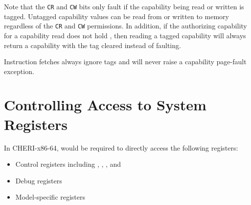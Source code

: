 Note that the \texttt{CR} and \texttt{CW} bits only fault if the
capability being read or written is tagged.  Untagged capability
values can be read from or written to memory regardless of the
\texttt{CR} and \texttt{CW} permissions.  In addition, if the
authorizing capability for a capability read does not hold \cappermLC,
then reading a tagged capability will always return a capability with
the tag cleared instead of faulting.

Instruction fetches always ignore tags and will never raise a
capability page-fault exception.

\section{Controlling Access to System Registers}

In CHERI-x86-64, \cappermASR{} would be required to directly access the
following registers:

\begin{itemize}
  \item Control registers including \KCC{}, \KSC{}, \CSTAR{}, and \KGS{}
  \item Debug registers
  \item Model-specific registers
\end{itemize}
